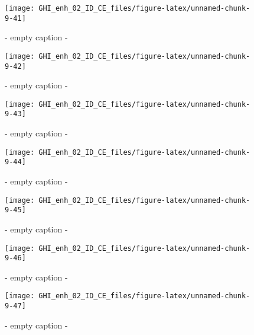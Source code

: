 \documentclass[
  10pt,
  a4paper,oneside]{article}
\begin{document}
\begin{figure}[H]

{\centering \texttt{[image: GHI\_enh\_02\_ID\_CE\_files/figure-latex/unnamed-chunk-9-41]} 

}

\caption{ - empty caption - }\label{fig:unnamed-chunk-9-41}
\end{figure}
\begin{figure}[H]

{\centering \texttt{[image: GHI\_enh\_02\_ID\_CE\_files/figure-latex/unnamed-chunk-9-42]} 

}

\caption{ - empty caption - }\label{fig:unnamed-chunk-9-42}
\end{figure}
\begin{figure}[H]

{\centering \texttt{[image: GHI\_enh\_02\_ID\_CE\_files/figure-latex/unnamed-chunk-9-43]} 

}

\caption{ - empty caption - }\label{fig:unnamed-chunk-9-43}
\end{figure}
\begin{figure}[H]

{\centering \texttt{[image: GHI\_enh\_02\_ID\_CE\_files/figure-latex/unnamed-chunk-9-44]} 

}

\caption{ - empty caption - }\label{fig:unnamed-chunk-9-44}
\end{figure}
\begin{figure}[H]

{\centering \texttt{[image: GHI\_enh\_02\_ID\_CE\_files/figure-latex/unnamed-chunk-9-45]} 

}

\caption{ - empty caption - }\label{fig:unnamed-chunk-9-45}
\end{figure}
\begin{figure}[H]

{\centering \texttt{[image: GHI\_enh\_02\_ID\_CE\_files/figure-latex/unnamed-chunk-9-46]} 

}

\caption{ - empty caption - }\label{fig:unnamed-chunk-9-46}
\end{figure}
\begin{figure}[H]

{\centering \texttt{[image: GHI\_enh\_02\_ID\_CE\_files/figure-latex/unnamed-chunk-9-47]} 

}

\caption{ - empty caption - }\label{fig:unnamed-chunk-9-47}
\end{figure}
\end{document}
